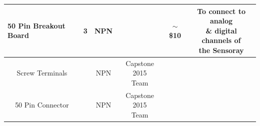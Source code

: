 \documentclass[12pt]{article}
\begin{document}
\begin{adjustwidth}{-2cm}{-2cm}
\begin{center}
\begin{tabular}{ |c|c|c|c|c|c| }
  \multicolumn{1}{|l|}{\textbf{50 Pin Breakout Board}} & 3 & NPN & & $\sim$\$10 & \makecell{To connect to analog \\ \& digital channels of \\ the Sensoray} \\ \hline  
  \multicolumn{1}{|c|}{Screw Terminals} & & NPN & \makecell{Capstone 2015 \\ Team} & & \\ \hline  
  \multicolumn{1}{|c|}{50 Pin Connector} & & NPN & \makecell{Capstone 2015 \\ Team} & & \\ \hline  
  
  
  
  
  
  
  
\end{tabular}

\end{center}




\clearpage

\end{adjustwidth}
\end{document}
